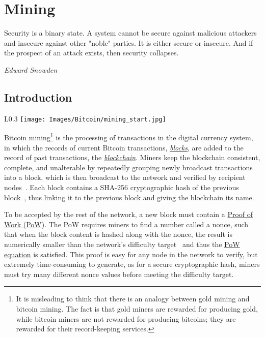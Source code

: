 \chapter{Mining}
%
\epigraph{Security is a binary state. A system cannot be secure against malicious attackers and insecure against other "noble" parties. It is either secure or insecure. And if the prospect of an attack exists, then security collapses.}{\textit{Edward Snowden}}
\section{Introduction}
\setlength{\intextsep}{0pt}
\begin{wrapfigure}[10]{L}{0.3\textwidth}
\centering
\texttt{[image: Images/Bitcoin/mining\_start.jpg]}
\end{wrapfigure}
Bitcoin mining\footnote{It is misleading to think that there is an analogy between gold mining and bitcoin mining. The fact is that gold miners are rewarded for producing gold, while bitcoin miners are not rewarded for producing bitcoins; they are rewarded for their record-keeping services.} is the processing of transactions in the digital currency system, in which the records of current Bitcoin transactions, \hyperref[sec:blocks]{\emph{blocks}}, are added to the record of past transactions, the \hyperref[sec:blockchain]{\emph{blockchain}}. Miners keep the blockchain consistent, complete, and unalterable by repeatedly grouping newly broadcast transactions into a block, which is then broadcast to the network and verified by recipient nodes~\cite{economist}. Each block contains a SHA-256 cryptographic hash of the previous block~\cite{economist}, thus linking it to the previous block and giving the blockchain its name.

To be accepted by the rest of the network, a new block must contain a \hyperref[proofOfWork]{Proof of Work (PoW)}. The PoW requires miners to find a number called a nonce, such that when the block content is hashed along with the nonce, the result is numerically smaller than the network's difficulty target~\cite{Nakamoto_bitcoin:a} and thus the \hyperref[eq:PoW]{PoW equation} is satisfied. This proof is easy for any node in the network to verify, but extremely time-consuming to generate, as for a secure cryptographic hash, miners must try many different nonce values before meeting the difficulty target.

